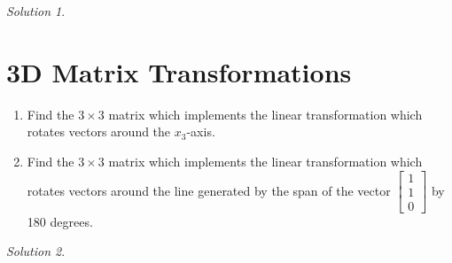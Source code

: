 \documentclass{article}
\theoremstyle{remark}
\newtheorem*{solution}{Solution}
\begin{document}
\begin{solution}
\end{solution}

\pagebreak
\section{3D Matrix Transformations}

\begin{enumerate}
\item Find the $3 \times 3$ matrix which implements the linear transformation which rotates vectors around the $x_3$-axis.
\item Find the $3 \times 3$ matrix which implements the linear transformation which rotates vectors around the line generated by the span of the vector $\begin{bmatrix} 1 \\ 1 \\ 0\end{bmatrix}$ by 180 degrees.
\end{enumerate}

\begin{solution}
\end{solution}
\end{document}
